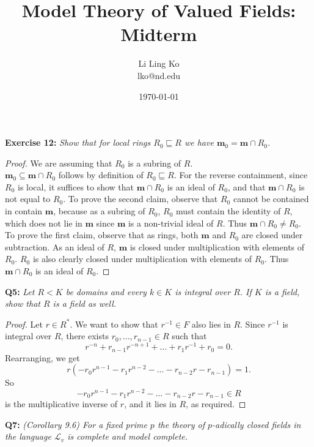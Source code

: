 \documentclass{article}
\begin{document}
\title{Model Theory of Valued Fields: Midterm}
\author{Li Ling Ko\\ lko@nd.edu}
\date{\today}
\maketitle

\textbf{Exercise 12:} \it Show that for local rings $R_0\sqsubseteq R$ we
  have $\bm{m}_0=\bm{m}\cap R_0$.

  \begin{proof}
    We are assuming that $R_0$ is a subring of $R$. \\

    $\bm{m}_0\subseteq\bm{m}\cap R_0$ follows by definition of
    $R_0\sqsubseteq R$. For the reverse containment, since $R_0$ is local,
    it suffices to show that $\bm{m}\cap R_0$ is an ideal of $R_0$, and
    that $\bm{m}\cap R_0$ is not equal to $R_0$. To prove the second
    claim, observe that $R_0$ cannot be contained in contain $\bm{m}$,
    because as a subring of $R_0$, $R_0$ must contain the identity of $R$,
    which does not lie in $\bm{m}$ since $\bm{m}$ is a non-trivial ideal of
    $R$. Thus $\bm{m}\cap R_0\neq R_0$. \\ 

    To prove the first claim, observe that as rings, both $\bm{m}$
    and $R_0$ are closed under subtraction. As an ideal of $R$, $\bm{m}$ is
    closed under multiplication with elements of $R_0$. $R_0$ is also
    clearly closed under multiplication with elements of $R_0$. Thus
    $\bm{m}\cap R_0$ is an ideal of $R_0$.
  \end{proof}

\textbf{Q5:} \it Let $R<K$ be domains and every $k\in K$ is integral over
  $R$. If $K$ is a field, show that $R$ is a field as well.
  \begin{proof}
    Let $r\in R^*$. We want to show that $r^{-1}\in F$ also lies in $R$.
    Since $r^{-1}$ is integral over $R$, there exists
    $r_0,\ldots,r_{n-1}\in R$ such that
    \[r^{-n}+r_{n-1}r^{-n+1} +\ldots +r_1r^{-1}+r_0=0.\]
    Rearranging, we get
    \[r(-r_0r^{n-1} -r_1r^{n-2} -\ldots -r_{n-2}r -r_{n-1}) = 1.\]
    So
    \[-r_0r^{n-1} -r_1r^{n-2} -\ldots -r_{n-2}r -r_{n-1} \in R\]
    is the multiplicative inverse of $r$, and it lies in $R$, as required.
  \end{proof}

\textbf{Q7:} \it (Corollary 9.6) For a fixed prime $p$ the theory of
  $p$-adically closed fields in the language $\mathcal{L}_v$ is complete
  and model complete.
\end{document}

